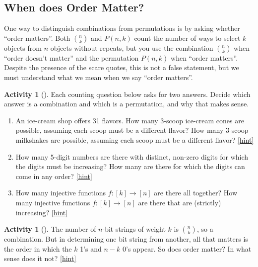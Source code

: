 \documentclass[10pt,]{book}
\theoremstyle{plain}
\theoremstyle{definition}
\theoremstyle{definition}
\theoremstyle{definition}
\newtheorem{activity}[project]{Activity}
\numberwithin{equation}{chapter}
\begin{document}
\subsection[{When does Order Matter?}]{When does Order Matter?}\label{subsec-ordermatters}
\hypertarget{p-788}{}%
One way to distinguish combinations from permutations is by asking whether ``order matters''.  Both \(\binom{n}{k}\) and \(P(n,k)\) count the number of ways to select \(k\) objects from \(n\) objects without repeats, but you use the combination \(\binom{n}{k}\) when ``order doesn't matter'' and the permutation \(P(n,k)\) when ``order matters''.  Despite the presence of the scare quotes, this is not a false statement, but we must understand what we mean when we say ``order matters''.%
\begin{activity}[]\label{activity-109}
\hypertarget{p-789}{}%
Each counting question below asks for two answers.  Decide which answer is a combination and which is a permutation, and why that makes sense.%
\begin{enumerate}[font=\bfseries,label=(\alph*),ref=\alph*]
\item\label{task-147} \hypertarget{p-790}{}%
An ice-cream shop offers 31 flavors.  How many 3-scoop ice-cream cones are possible, assuming each scoop must be a different flavor?  How many 3-scoop milkshakes are possible, assuming each scoop must be a different flavor?%
\hfill{\tiny\hyperlink{a-116.a}{[hint]}\hypertarget{q-116.a}{}}\item\label{task-148} \hypertarget{p-792}{}%
How many 5-digit numbers are there with distinct, non-zero digits for which the digits must be increasing?  How many are there for which the digits can come in any order?%
\hfill{\tiny\hyperlink{a-116.b}{[hint]}\hypertarget{q-116.b}{}}\item\label{task-149} \hypertarget{p-794}{}%
How many injective functions \(f:[k] \to [n]\) are there all   together?  How many injective functions \(f:[k] \to [n]\) are there that are (strictly) increasing?%
\hfill{\tiny\hyperlink{a-116.c}{[hint]}\hypertarget{q-116.c}{}}\end{enumerate}
\end{activity}
\begin{activity}[]\label{activity-110}
\hypertarget{p-796}{}%
The number of \(n\)-bit strings of weight \(k\) is \(\binom{n}{k}\), so a combination.  But in determining one bit string from another, all that matters is the order in which the \(k\) 1's and \(n-k\) 0's appear.  So does order matter?  In what sense does it not?%
\hfill{\tiny\hyperlink{a-117}{[hint]}\hypertarget{q-117}{}}\end{activity}
\end{document}
